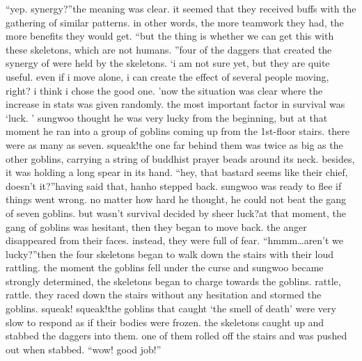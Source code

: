 “yep.
 synergy?”the meaning was clear.
 it seemed that they received buffs with the gathering of similar patterns.
 in other words, the more teamwork they had, the more benefits they would get.
“but the thing is whether we can get this with these skeletons, which are not humans.
”four of the daggers that created the synergy of  were held by the skeletons.
‘i am not sure yet, but they are quite useful.
 even if i move alone, i can create the effect of several people moving, right? i think i chose the good one.
’now the situation was clear where the increase in stats was given randomly.
 the most important factor in survival was ‘luck.
’ sungwoo thought he was very lucky from the beginning, but at that moment he ran into a group of goblins coming up from the 1st-floor stairs.
 there were as many as seven.
squeak!the one far behind them was twice as big as the other goblins, carrying a string of buddhist prayer beads around its neck.
 besides, it was holding a long spear in its hand.
“hey, that bastard seems like their chief, doesn’t it?”having said that, hanho stepped back.
 sungwoo was ready to flee if things went wrong.
 no matter how hard he thought, he could not beat the gang of seven goblins.
but wasn’t survival decided by sheer luck?at that moment, the gang of goblins was hesitant, then they began to move back.
 the anger disappeared from their faces.
 instead, they were full of fear.
“hmmm…aren’t we lucky?”then the four skeletons began to walk down the stairs with their loud rattling.
the moment the goblins fell under the curse and sungwoo became strongly determined, the skeletons began to charge towards the goblins.
rattle, rattle.
they raced down the stairs without any hesitation and stormed the goblins.
squeak! squeak!the goblins that caught ‘the smell of death’ were very slow to respond as if their bodies were frozen.
 the skeletons caught up and stabbed the daggers into them.
 one of them rolled off the stairs and was pushed out when stabbed.
“wow! good job!”

 